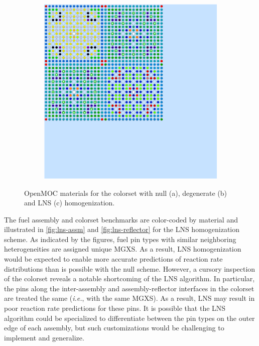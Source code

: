 \begin{figure}[h!]
\begin{subfigure}{0.33\textwidth}
  \caption{}
  \label{fig:degenerate-reflector}
\end{subfigure}
\begin{subfigure}{0.33\textwidth}
  \centering
  \includegraphics[width=0.9\linewidth]{figures/reflector/lns-materials}
  \caption{}
  \label{fig:lns-reflector}
\end{subfigure}
\caption{OpenMOC materials for the colorset with null (a), degenerate (b) and LNS (c) homogenization.}
\label{fig:benchmarks-colorset}
\end{figure}

The fuel assembly and colorset benchmarks are color-coded by material and illustrated in \autoref{fig:lns-assm} and \autoref{fig:lns-reflector} for the LNS homogenization scheme. As indicated by the figures, fuel pin types with similar neighboring heterogeneities are assigned unique MGXS. As a result, LNS homogenization would be expected to enable more accurate predictions of reaction rate distributions than is possible with the null scheme. However, a cursory inspection of the colorset reveals a notable shortcoming of the LNS algorithm. In particular, the pins along the inter-assembly and assembly-reflector interfaces in the colorset are treated the same (\textit{i.e.}, with the same MGXS). As a result, LNS may result in poor reaction rate predictions for these pins. It is possible that the LNS algorithm could be specialized to differentiate between the pin types on the outer edge of each assembly, but such customizations would be challenging to implement and generalize.

